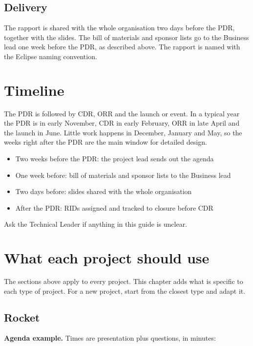 \documentclass{../../Common/Latex/Templates/rapport}
\renewcommand{\vsection}[1]{\section{#1}}
\renewcommand{\vsubsection}[1]{\subsection{#1}}
\begin{document}
\vsubsection{Delivery}
The rapport is shared with the whole organisation two days before the PDR, together with the slides. The bill of materials and sponsor lists go to the Business lead one week before the PDR, as described above. The rapport is named with the Eclipse naming convention.

\vsection{Timeline}
The PDR is followed by CDR, ORR and the launch or event. In a typical year the PDR is in early November, CDR in early February, ORR in late April and the launch in June. Little work happens in December, January and May, so the weeks right after the PDR are the main window for detailed design.
\begin{itemize}
  \item Two weeks before the PDR: the project lead sends out the agenda
  \item One week before: bill of materials and sponsor lists to the Business lead
  \item Two days before: slides shared with the whole organisation
  \item After the PDR: RIDs assigned and tracked to closure before CDR
\end{itemize}

Ask the Technical Leader if anything in this guide is unclear.

\vsection{What each project should use}
The sections above apply to every project. This chapter adds what is specific to each type of project. For a new project, start from the closest type and adapt it.

\vsubsection{Rocket}
\noindent\textbf{Agenda example.} Times are presentation plus questions, in minutes:
\end{document}
